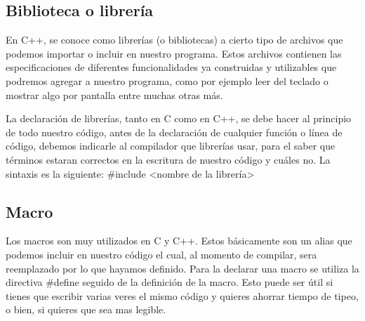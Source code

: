 \subsection{Biblioteca o librería}
En C++, se conoce como librerías (o bibliotecas) a cierto tipo de archivos que podemos importar o incluir en nuestro programa. Estos archivos contienen las especificaciones de diferentes funcionalidades ya construidas y utilizables que podremos agregar a nuestro programa, como por ejemplo leer del teclado o mostrar algo por pantalla entre muchas otras más. 

La declaración de librerías, tanto en C como en C++, se debe hacer al principio de todo nuestro código, antes de la declaración de cualquier función o línea de código, debemos indicarle al compilador que librerías usar, para el saber que términos estaran correctos en la escritura de nuestro código y cuáles no. La sintaxis es la siguiente: \#include <nombre de la librería>

\subsection{Macro}
Los macros son muy utilizados en C y C++. Estos básicamente son un alias que podemos incluir en nuestro código el cual, al momento de compilar, sera reemplazado por lo que hayamos definido. Para la declarar una macro se utiliza la directiva \#define seguido de la definición de la macro. Esto puede ser útil si tienes que escribir varias veres el mismo código y quieres ahorrar tiempo de tipeo, o bien, si quieres que sea mas legible.